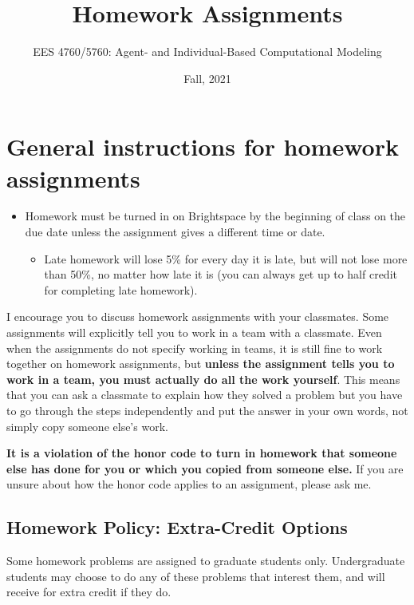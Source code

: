 \documentclass[
]{article}
\title{Homework Assignments}
\author{EES 4760/5760: Agent- and Individual-Based Computational
Modeling}
\date{Fall, 2021}
\providecommand{\tightlist}{%
  \setlength{\itemsep}{0pt}\setlength{\parskip}{0pt}}
\begin{document}
\maketitle

\hypertarget{general-instructions-for-homework-assignments}{%
\section{General instructions for homework
assignments}\label{general-instructions-for-homework-assignments}}

\begin{itemize}
\tightlist
\item
  Homework must be turned in on Brightspace by the beginning of class on
  the due date unless the assignment gives a different time or date.

  \begin{itemize}
  \tightlist
  \item
    Late homework will lose 5\% for every day it is late, but will not
    lose more than 50\%, no matter how late it is (you can always get up
    to half credit for completing late homework).
  \end{itemize}
\end{itemize}

I encourage you to discuss homework assignments with your classmates.
Some assignments will explicitly tell you to work in a team with a
classmate. Even when the assignments do not specify working in teams, it
is still fine to work together on homework assignments, but
\textbf{unless the assignment tells you to work in a team, you must
actually do all the work yourself}. This means that you can ask a
classmate to explain how they solved a problem but you have to go
through the steps independently and put the answer in your own words,
not simply copy someone else's work.

\textbf{It is a violation of the honor code to turn in homework that
someone else has done for you or which you copied from someone else.} If
you are unsure about how the honor code applies to an assignment, please
ask me.

\hypertarget{homework-policy-extra-credit-options}{%
\subsection{Homework Policy: Extra-Credit
Options}\label{homework-policy-extra-credit-options}}

Some homework problems are assigned to graduate students only.
Undergraduate students may choose to do any of these problems that
interest them, and will receive for extra credit if they do.
\end{document}
